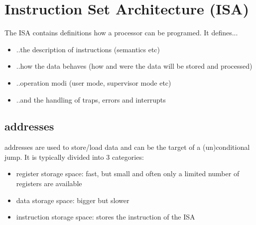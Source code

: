 \documentclass[a4paper]{scrartcl}
\begin{document}
    \section{Instruction Set Architecture (ISA)}
        The ISA contains definitions how a processor can be programed. It defines...
        \begin{itemize}
            \item ..the description of instructions (semantics etc)
            \item ..how the data behaves (how and were the data will be stored and processed)
            \item ..operation modi (user mode, supervisor mode etc)
            \item ..and the handling of traps, errors and interrupts 
        \end{itemize}
        \subsection{addresses}
            addresses are used to store/load data and can be the target of a (un)conditional jump. %
            It is typically divided into 3 categories: 
            \begin{itemize}
                \item register storage space: fast, but small and often only a limited number of registers are available  
                \item data storage space: bigger but slower
                \item instruction storage space: stores the instruction of the ISA
            \end{itemize}

\end{document}
